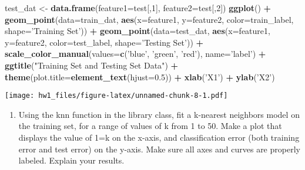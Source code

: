 \documentclass[]{article}
\newenvironment{Shaded}{\begin{snugshade}}{\end{snugshade}}
\newcommand{\DataTypeTok}[1]{\textcolor[rgb]{0.13,0.29,0.53}{#1}}
\newcommand{\DecValTok}[1]{\textcolor[rgb]{0.00,0.00,0.81}{#1}}
\newcommand{\FloatTok}[1]{\textcolor[rgb]{0.00,0.00,0.81}{#1}}
\newcommand{\KeywordTok}[1]{\textcolor[rgb]{0.13,0.29,0.53}{\textbf{#1}}}
\newcommand{\NormalTok}[1]{#1}
\newcommand{\OperatorTok}[1]{\textcolor[rgb]{0.81,0.36,0.00}{\textbf{#1}}}
\newcommand{\StringTok}[1]{\textcolor[rgb]{0.31,0.60,0.02}{#1}}
\providecommand{\tightlist}{%
  \setlength{\itemsep}{0pt}\setlength{\parskip}{0pt}}
\begin{document}
\begin{Shaded}
\begin{Highlighting}[]
\NormalTok{test_dat <-}\StringTok{ }\KeywordTok{data.frame}\NormalTok{(}\DataTypeTok{feature1=}\NormalTok{test[,}\DecValTok{1}\NormalTok{], }\DataTypeTok{feature2=}\NormalTok{test[,}\DecValTok{2}\NormalTok{])}
\KeywordTok{ggplot}\NormalTok{() }\OperatorTok{+}\StringTok{ }\KeywordTok{geom_point}\NormalTok{(}\DataTypeTok{data=}\NormalTok{train_dat, }\KeywordTok{aes}\NormalTok{(}\DataTypeTok{x=}\NormalTok{feature1, }\DataTypeTok{y=}\NormalTok{feature2, }\DataTypeTok{color=}\NormalTok{train_label, }\DataTypeTok{shape=}\StringTok{'Training Set'}\NormalTok{)) }\OperatorTok{+}\StringTok{ }\KeywordTok{geom_point}\NormalTok{(}\DataTypeTok{data=}\NormalTok{test_dat, }\KeywordTok{aes}\NormalTok{(}\DataTypeTok{x=}\NormalTok{feature1, }\DataTypeTok{y=}\NormalTok{feature2, }\DataTypeTok{color=}\NormalTok{test_label, }\DataTypeTok{shape=}\StringTok{'Testing Set'}\NormalTok{)) }\OperatorTok{+}\StringTok{ }\KeywordTok{scale_color_manual}\NormalTok{(}\DataTypeTok{values=}\KeywordTok{c}\NormalTok{(}\StringTok{'blue'}\NormalTok{, }\StringTok{'green'}\NormalTok{, }\StringTok{'red'}\NormalTok{), }\DataTypeTok{name=}\StringTok{'label'}\NormalTok{) }\OperatorTok{+}\StringTok{ }\KeywordTok{ggtitle}\NormalTok{(}\StringTok{"Training Set and Testing Set Data"}\NormalTok{) }\OperatorTok{+}\StringTok{ }\KeywordTok{theme}\NormalTok{(}\DataTypeTok{plot.title=}\KeywordTok{element_text}\NormalTok{(}\DataTypeTok{hjust=}\FloatTok{0.5}\NormalTok{)) }\OperatorTok{+}\StringTok{ }\KeywordTok{xlab}\NormalTok{(}\StringTok{'X1'}\NormalTok{) }\OperatorTok{+}\StringTok{ }\KeywordTok{ylab}\NormalTok{(}\StringTok{'X2'}\NormalTok{)}
\end{Highlighting}
\end{Shaded}

\texttt{[image: hw1\_files/figure-latex/unnamed-chunk-8-1.pdf]}

\begin{enumerate}
\def\labelenumi{(\alph{enumi})}
\setcounter{enumi}{2}
\tightlist
\item
  Using the knn function in the library class, fit a k-nearest neighbors
  model on the training set, for a range of values of k from 1 to 50.
  Make a plot that displays the value of 1=k on the x-axis, and
  classification error (both training error and test error) on the
  y-axis. Make sure all axes and curves are properly labeled. Explain
  your results.
\end{enumerate}
\end{document}
